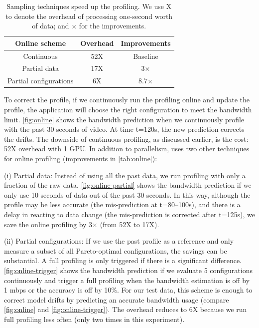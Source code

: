 
\begin{table}[t]
  \footnotesize
  \centering
  \begin{tabular}{c c c}
    \toprule
    Online scheme & Overhead & Improvements \\
    \midrule
    Continuous & 52X & Baseline \\
    Partial data & 17X & 3$\times$\\
    Partial configurations & 6X & 8.7$\times$ \\
    \bottomrule
  \end{tabular}
  \caption{Sampling techniques speed up the profiling. We use X to denote the
    overhead of processing one-second worth of data; and $\times$ for the
    improvements. }
  \label{tab:online}
\end{table}

To correct the profile, if we continuously run the profiling online and update
the profile, the application will choose the right configuration to meet the
bandwidth limit.  \autoref{fig:online} shows the bandwidth prediction when we
continuously profile with the past 30 seconds of video. At time t=120s, the new
prediction corrects the drifts. The downside of continuous profiling, as
discussed earlier, is the cost: 52X overhead with 1 GPU\@. In addition to
parallelism, \sysname{} uses two other techniques for online profiling
(improvements in \autoref{tab:online}):

(i) Partial data: Instead of using all the past data, we run profiling with only
a fraction of the raw data.  \autoref{fig:online-partial} shows the bandwidth
prediction  if we only use 10 seconds of data out
of the past 30 seconds. In this
way, although the profile may be less accurate (the mis-prediction at
t=80--100s), and there is a delay in reacting to data change (the mis-prediction
is corrected after t=125s), we save the online profiling by 3$\times$ (from 52X
to 17X).

(ii) Partial configurations: If we use the past profile as a reference and only
measure a subset of all Pareto-optimal configurations, the savings can be
substantial. A full profiling is only triggered if there is a significant
difference. \autoref{fig:online-trigger} shows the bandwidth prediction if we
evaluate 5 configurations continuously and trigger a full profiling when the
bandwidth estimation is off by 1 mbps or the accuracy is off by 10\%.  For our
test data, this scheme is enough to correct model drifts by predicting an
accurate bandwidth usage (compare \autoref{fig:online} and
\autoref{fig:online-trigger}).  The overhead reduces to 6X because we run full
profiling less often (only two times in this experiment).

